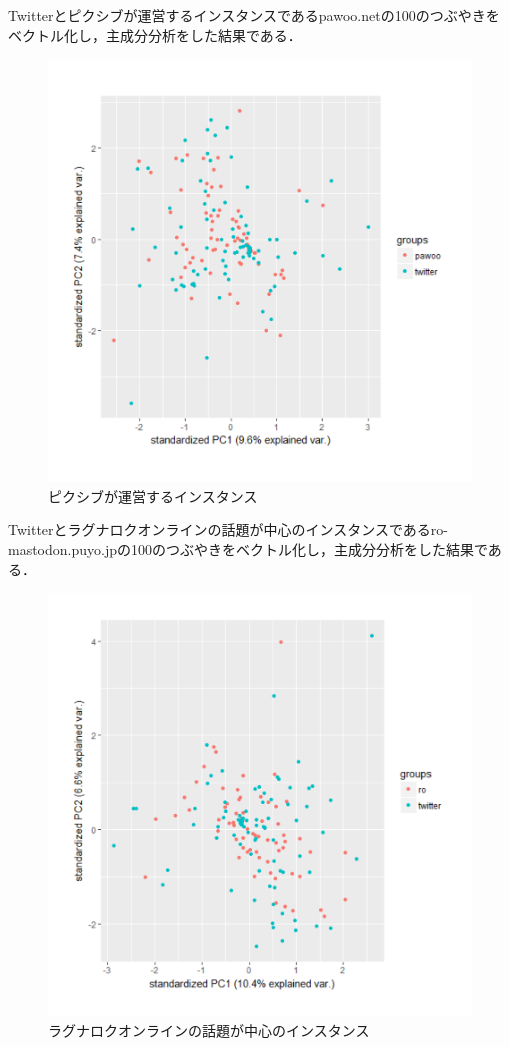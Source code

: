 Twitterとピクシブが運営するインスタンスであるpawoo.netの100のつぶやきをベクトル化し，主成分分析をした結果である．
\begin{figure}[h]
\centering
\includegraphics[width=13cm,clip]{pawoo.pdf}
\caption{ピクシブが運営するインスタンス}\label{pawoo}
\end{figure}
\newpage

Twitterとラグナロクオンラインの話題が中心のインスタンスであるro-mastodon.puyo.jpの100のつぶやきをベクトル化し，主成分分析をした結果である．
\begin{figure}[h]
\centering
\includegraphics[width=13cm,clip]{ro.pdf}
\caption{ラグナロクオンラインの話題が中心のインスタンス}\label{ro}
\end{figure}
\newpage

